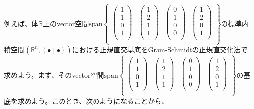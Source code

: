 \documentclass[dvipdfmx]{jsarticle}
\begin{document}
例えば、体$\mathbb{R}$上のvector空間$\mathrm{span}\begin{Bmatrix}
\begin{pmatrix}
1 \\
1 \\
0 \\
1 \\
\end{pmatrix} & \begin{pmatrix}
1 \\
2 \\
1 \\
1 \\
\end{pmatrix} & \begin{pmatrix}
0 \\
1 \\
0 \\
0 \\
\end{pmatrix} & \begin{pmatrix}
1 \\
2 \\
0 \\
1 \\
\end{pmatrix} \\
\end{Bmatrix}$の標準内積空間$\left( \mathbb{R}^{n},\left( \bullet \middle| \bullet \right) \right)$における正規直交基底をGram-Schmidtの正規直交化法で求めよう。まず、そのvector空間$\mathrm{span}\begin{Bmatrix}
\begin{pmatrix}
1 \\
1 \\
0 \\
1 \\
\end{pmatrix} & \begin{pmatrix}
1 \\
2 \\
1 \\
1 \\
\end{pmatrix} & \begin{pmatrix}
0 \\
1 \\
0 \\
0 \\
\end{pmatrix} & \begin{pmatrix}
1 \\
2 \\
0 \\
1 \\
\end{pmatrix} \\
\end{Bmatrix}$の基底を求めよう。このとき、次のようになることから、
\end{document}
